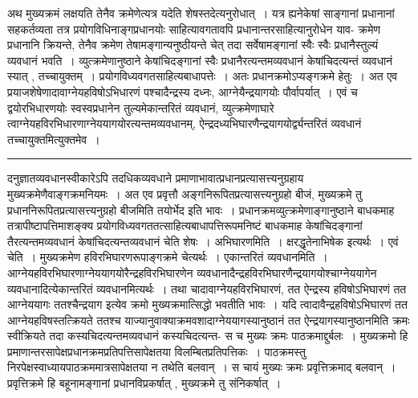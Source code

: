 \documentclass[11pt, openany]{book}
\makeatletter
\def\blfootnote{\gdef\@thefnmark{}\@footnotetext}
\makeatother
\begin{document}
 अथ मुख्यक्रमं लक्षयति तेनैव क्रमेणेत्यत्र यदेति शेषस्तदेत्यनुरोधात्~। यत्र ह्यनेकेषां साङ्गानां प्रधानानां सहकर्तव्यता
तत्र प्रयोगविधिनाङ्गप्रधानयोः साहित्यावगतावपि प्रधानान्तरसाहित्यानुरोधेन याव- 
\newpage
\fancyhead[LO]{लक्षणम् ]}
{\bl\noindent क्रमेण प्रधानानि क्रियन्ते, तेनैव क्रमेण तेषामङ्गान्यनुष्ठीयन्ते चेत् तदा सर्वेषामङ्गानां स्वैः स्वैः प्रधानैस्तुल्यं व्यवधानं भवति~। व्युत्क्रमेणानुष्ठाने
केषांचिदङ्गानां स्वैः प्रधानैरत्यन्तमव्यवधानं केषांचिदत्यन्तं व्यवधानं स्यात् , तच्चायुक्तम्~। प्रयोगविध्यवगतसाहित्यबाधापत्तेः~। अतः प्रधानक्रमोऽप्यङ्गक्रमे हेतुः~। अत एव प्रयाजशेषेणादावाग्नेयहविषोऽभिधारणं पश्चादैन्द्रस्य दध्नः, आग्नेयैन्द्रयागयोः पौर्वापर्यात्~। एवं च द्वयोरभिधारणयोः स्वस्वप्रधानेन तुल्यमेकान्तरितं व्यवधानं, व्युत्क्रमेणाघारे त्वाग्नेयहविरभिधारणाग्नेययागयोरत्यन्तमव्यवधानम्, ऐन्द्रदध्यभिघारणैन्द्रयागयोर्द्व्यन्तरितं व्यवधानं तच्चा\footnotemark युक्तमित्युक्तमेव~।}\\
\hrule
\vspace{3mm}
\noindent
दनुज्ञातव्यवधानस्वीकारेऽपि तदधिकव्यवधाने प्रमाणाभावात्प्रधानप्रत्यासत्त्यनुग्रहाय मुख्यक्रमेणैवाङ्गक्रमनियमः~। अत एव प्रवृत्तौ अङ्गनिरूपितप्रत्यासत्त्यनुग्रहो बीजं, मुख्यक्रमे तु प्रधाननिरूपितप्रत्यासत्त्यनुग्रहो बीजमिति तयोर्भेद इति भावः~। प्रधानक्रमव्युत्क्रमेणाङ्गानुष्ठाने बाधकमाह
तत्रापीष्टापत्तिमाशङ्क्य प्रयोगविध्यवगततत्साहित्यबाधापत्तिरूपमनिष्टं बाधकमाह केषांचिदङ्गानां तैरत्यन्तमव्यवधानं
केषांचिदत्यन्तव्यवधानं चेति शेषः~। {\br अभिघारणमिति~।} क्षरद्धृतेनाभिषेक इत्यर्थः~। {\br एवं चेति~।} मुख्यक्रमेण हविरभिघारणरूपाङ्गक्रमे चेत्यर्थः~।
{\br एकान्तरितं व्यवधानमिति~।} आग्नेयहविरभिघारणाग्नेययागयोरैन्द्रहविरभिघारणेन व्यवधानादैन्द्रहविरभिघारणैन्द्रयागयोश्चाग्नेययागेन व्यवधानादित्येकान्तरितं व्यवधानमित्यर्थः~। तथा चादावाग्नेयहविरभिघारणं, तत ऐन्द्रस्य हविषोऽभिघारणं तत आग्नेययागः ततश्चैन्द्रयाग इत्येव क्रमो मुख्यक्रमात्सिद्धो भवतीति भावः~। यदि त्वादावैन्द्रहविषोऽभिघारणं तत आग्नेयहविषस्तत्क्रियते ततश्च याज्यानुवाक्याक्रमवशादाग्नेययागस्यानुष्ठानं तत ऐन्द्रयागस्यानुष्ठानमिति क्रमः स्वीक्रियते तदा कस्यचिदत्यन्तमव्यवधानं कस्यचिदत्यन्त-
\blfootnote{पाठा०\textemdash\ $^{१}$तच्चायुक्तमेव.}
\newpage
{\bl\noindent स च मुख्यः क्रमः पाठक्रमाद्दुर्बलः~। मुख्यक्रमो हि प्रमाणान्तरसापेक्षप्रधानक्रमप्रतिपत्तिसापेक्षतया विलम्बितप्रतिपत्तिकः~। पाठक्रमस्तु निरपेक्षस्वाध्यायपाठक्रममात्रसापेक्षतया न तथेति बलवान्~। स चायं मुख्यः क्रमः प्रवृत्तिक्रमाद् बलवान्~। प्रवृत्तिक्रमे हि बहूनामङ्गानां प्रधानविप्रकर्षात् , मुख्यक्रमे तु संनिकर्षात्~।}\\
\end{document}
